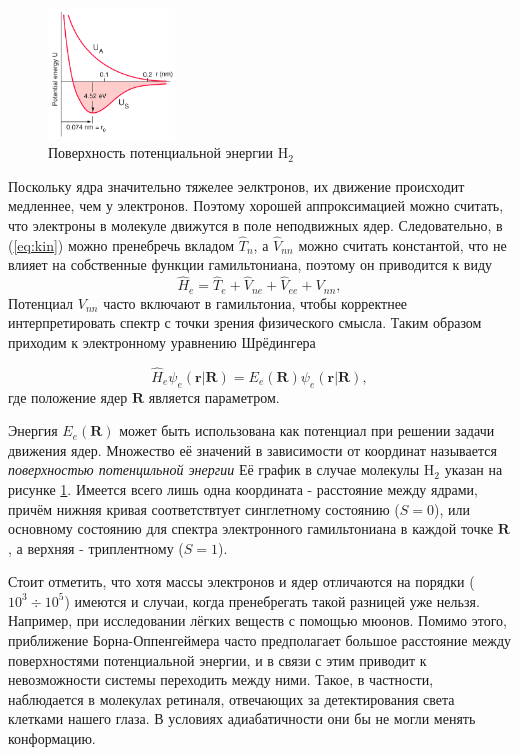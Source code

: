 \documentclass[12pt, oneside]{article}
\numberwithin{equation}{section}  %
\begin{document}
\begin{figure}
    \centering
    \includegraphics[width=0.3\textwidth]{./images/H2.png}
    \caption{Поверхность потенциальной энергии H\(_2\)}
    \label{fig:H2PPE}
\end{figure}
Поскольку ядра значительно тяжелее эелктронов, их движение происходит медленнее, чем у электронов. Поэтому хорошей аппроксимацией можно считать, что электроны в молекуле движутся в поле неподвижных ядер. 
Следовательно, в (\ref{eq:kin}) можно пренебречь вкладом \(\hat{T}_n\), а \(\hat{V}_{nn}\) можно считать константой, что не влияет на собственные функции гамильтониана, поэтому он приводится к виду
\begin{equation}
    \hat{H}_e = \hat{T}_e + \hat{V}_{ne} + \hat{V}_{ee} + V_{nn},
    \label{eq:H_e}
\end{equation}
Потенциал \(V_{nn}\) часто включают в гамильтониа, чтобы корректнее интерпретировать спектр с точки зрения физического смысла.
Таким образом приходим к электронному уравнению Шрёдингера

\begin{equation}
    \hat{H}_e \psi_e (\bm{r}| \bm{R} ) = E_e (\bm{R}) \psi_e (\bm{r}| \bm{R}),
\end{equation}
где положение ядер \(\bm{R}\) является параметром.



Энергия \(E_e(\bm{R})\) может быть использована как потенциал при решении задачи движения ядер. Множество её значений в зависимости от координат называется \textit{поверхностью потенцильной энергии} Её график в случае молекулы H\(_2\) указан на рисунке \ref{fig:H2PPE}. Имеется всего лишь одна координата - расстояние между ядрами, причём нижняя кривая соответствтует синглетному состоянию (\(S = 0\)), или основному состоянию для спектра электронного гамильтониана в каждой точке \(\bm{R}\), а верхняя - триплентному (\(S = 1\)). 

Стоит отметить, что хотя массы электронов и ядер отличаются на порядки (\(10^3 \div 10^5\)) имеются и случаи, когда пренебрегать такой разницей уже нельзя. Например, при исследовании лёгких веществ с помощью мюонов. Помимо этого, приближение Борна-Оппенгеймера часто предполагает большое расстояние между поверхностями потенциальной энергии, и в связи с этим приводит к невозможности системы переходить между ними. Такое, в частности, наблюдается в молекулах ретиналя, отвечающих за детектирования света клетками нашего глаза. В условиях адиабатичности они бы не могли менять конформацию.
\end{document}
